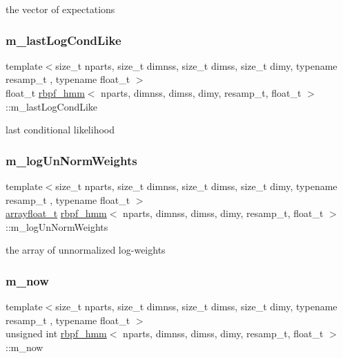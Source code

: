 the vector of expectations \mbox{\label{classrbpf__hmm_a8b08a5af7f7ef6b0079c69ff0c6b485f}} 
\subsubsection{\texorpdfstring{m\+\_\+last\+Log\+Cond\+Like}{m\_lastLogCondLike}}
{\footnotesize\ttfamily template$<$size\+\_\+t nparts, size\+\_\+t dimnss, size\+\_\+t dimss, size\+\_\+t dimy, typename resamp\+\_\+t , typename float\+\_\+t $>$ \\
float\+\_\+t \hyperlink{classrbpf__hmm}{rbpf\+\_\+hmm}$<$ nparts, dimnss, dimss, dimy, resamp\+\_\+t, float\+\_\+t $>$\+::m\+\_\+last\+Log\+Cond\+Like\hspace{0.3cm}{\ttfamily [private]}}

last conditional likelihood \mbox{\label{classrbpf__hmm_a6dc40d4e2fd23ce66be5473bdaf438a5}} 
\subsubsection{\texorpdfstring{m\+\_\+log\+Un\+Norm\+Weights}{m\_logUnNormWeights}}
{\footnotesize\ttfamily template$<$size\+\_\+t nparts, size\+\_\+t dimnss, size\+\_\+t dimss, size\+\_\+t dimy, typename resamp\+\_\+t , typename float\+\_\+t $>$ \\
\hyperlink{classrbpf__hmm_aae4e776097278c6e5c25f614d7cad7bd}{arrayfloat\+\_\+t} \hyperlink{classrbpf__hmm}{rbpf\+\_\+hmm}$<$ nparts, dimnss, dimss, dimy, resamp\+\_\+t, float\+\_\+t $>$\+::m\+\_\+log\+Un\+Norm\+Weights\hspace{0.3cm}{\ttfamily [private]}}

the array of unnormalized log-\/weights \mbox{\label{classrbpf__hmm_a1405e1f6ce133cf4d0089bb9cc875d0e}} 
\subsubsection{\texorpdfstring{m\+\_\+now}{m\_now}}
{\footnotesize\ttfamily template$<$size\+\_\+t nparts, size\+\_\+t dimnss, size\+\_\+t dimss, size\+\_\+t dimy, typename resamp\+\_\+t , typename float\+\_\+t $>$ \\
unsigned int \hyperlink{classrbpf__hmm}{rbpf\+\_\+hmm}$<$ nparts, dimnss, dimss, dimy, resamp\+\_\+t, float\+\_\+t $>$\+::m\+\_\+now\hspace{0.3cm}{\ttfamily [private]}}

